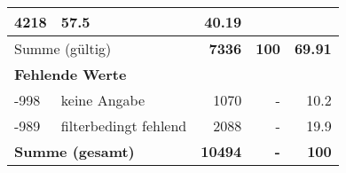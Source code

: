 \begin{longtable}{lXrrr}
       \num{4218} &
       \num[round-mode=places,round-precision=2]{57.5} &
         \num[round-mode=places,round-precision=2]{40.19} \\
     \midrule
     \multicolumn{2}{l}{Summe (gültig)} &
       \textbf{\num{7336}} &
     \textbf{\num{100}} &
       \textbf{\num[round-mode=places,round-precision=2]{69.91}} \\
     \multicolumn{5}{l}{\textbf{Fehlende Werte}}\\
       -998 &
       keine Angabe &
         \num{1070} &
        - &
         \num[round-mode=places,round-precision=2]{10.2} \\
       -989 &
       filterbedingt fehlend &
         \num{2088} &
        - &
         \num[round-mode=places,round-precision=2]{19.9} \\
     \midrule
     \multicolumn{2}{l}{\textbf{Summe (gesamt)}} &
          \textbf{\num{10494}} &
        \textbf{-} &
        \textbf{\num{100}} \\
     \bottomrule
     \end{longtable}
     
